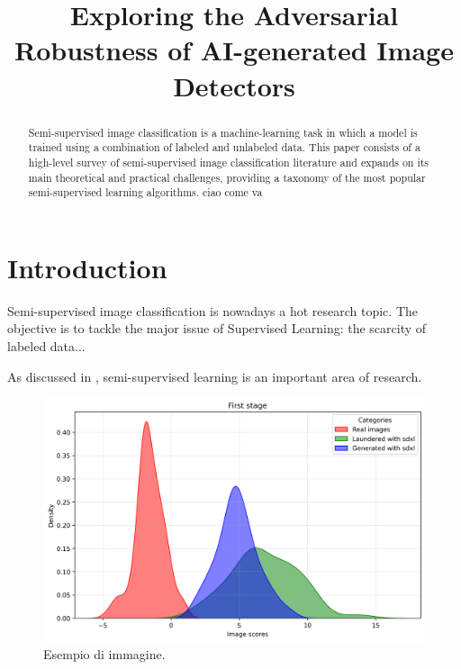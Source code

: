 \documentclass[conference]{IEEEtran} %
\begin{document}

\title{Exploring the Adversarial Robustness of AI-generated Image Detectors}

\author{
}

\maketitle

\begin{abstract}
Semi-supervised image classification is a machine-learning task in which a model is trained using a combination of labeled and unlabeled data. This paper consists of a high-level survey of semi-supervised image classification literature and expands on its main theoretical and practical challenges, providing a taxonomy of the most popular semi-supervised learning algorithms. ciao come va
\end{abstract}

\section{Introduction}
Semi-supervised image classification is nowadays a hot research topic. The objective is to tackle the major issue of Supervised Learning: the scarcity of labeled data...

As discussed in \cite{corvi2023detection}, semi-supervised learning is an important area of research.

\begin{figure}[h]
    \centering
    \includegraphics[width=0.8\linewidth]{Img/First_stage.png}
    \caption{Esempio di immagine.}
    \label{fig:esempio}
\end{figure}
\end{document}

